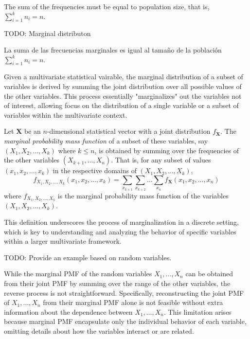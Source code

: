 The sum of the frequencies must be equal to population size, that is, $\sum_{i=1}^k n_i = n$.


{\color{red} TODO: Marginal distributon}

La suma de las frecuencias marginales es igual al tamaño de la población $\sum_{i=1}^k n_i = n$.

Given a multivariate statistical vairable, the marginal distribution of a subset of variables is derived by summing the joint distribution over all possible values of the other variables. This process essentially "marginalizes" out the variables not of interest, allowing focus on the distribution of a single variable or a subset of variables within the multivariate context.

\begin{definition}
Let $\mathbf{X}$ be an $n$-dimensional statistical vector with a joint distribution $f_\mathbf{X}$. The \emph{marginal probability mass function} of a subset of these variables, say $(X_1, X_2, \ldots, X_k)$ where $k \leq n$, is obtained by summing over the frequencies of the other variables $(X_{k+1}, \ldots, X_n)$. That is, for any subset of values $(x_1, x_2, \ldots, x_k)$ in the respective domains of $(X_1, X_2, \ldots, X_k)$,
\[
f_{X_1, X_2, \ldots, X_k}(x_1, x_2, \ldots, x_k) = \sum_{x_{k+1}} \sum_{x_{k+2}} \ldots \sum_{x_n} f_\mathbf{X}(x_1, x_2, \ldots, x_n)
\]
where $f_{X_1, X_2, \ldots, X_k}$ is the marginal probability mass function of the variables $(X_1, X_2, \ldots, X_k)$.
\end{definition}

This definition underscores the process of marginalization in a discrete setting, which is key to understanding and analyzing the behavior of specific variables within a larger multivariate framework.

\begin{example}
{\color{red} TODO: Provide an example based on random variables.}
\end{example}

While the marginal PMF of the random variables $X_1, \ldots, X_n$ can be obtained from their joint PMF by summing over the range of the other variables, the reverse process is not straightforward. Specifically, reconstructing the joint PMF of $X_1, \ldots, X_n$ from their marginal PMF alone is not feasible without extra information about the dependence between $X_1, \ldots, X_n$. This limitation arises because marginal PMF encapsulate only the individual behavior of each variable, omitting details about how the variables interact or are related.

